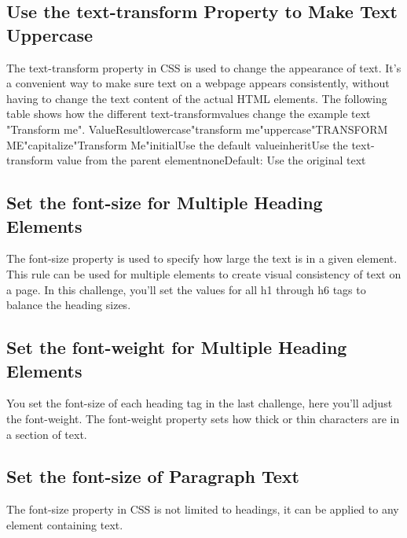 \documentclass{article}%
\begin{document}
\subsection{Use the text{-}transform Property to Make Text Uppercase}%
\label{subsec:Usethetext{-}transformPropertytoMakeTextUppercase}%
The text{-}transform property in CSS is used to change the appearance of text. It's a convenient way to make sure text on a webpage appears consistently, without having to change the text content of the actual HTML elements.\newline%
The following table shows how the different text{-}transformvalues change the example text "Transform me".\newline%
ValueResultlowercase"transform me"uppercase"TRANSFORM ME"capitalize"Transform Me"initialUse the default valueinheritUse the text{-}transform value from the parent elementnoneDefault: Use the original text\newline%

%
\subsection{Set the font{-}size for Multiple Heading Elements}%
\label{subsec:Setthefont{-}sizeforMultipleHeadingElements}%
The font{-}size property is used to specify how large the text is in a given element. This rule can be used for multiple elements to create visual consistency of text on a page. In this challenge, you'll set the values for all h1 through h6 tags to balance the heading sizes.\newline%

%
\subsection{Set the font{-}weight for Multiple Heading Elements}%
\label{subsec:Setthefont{-}weightforMultipleHeadingElements}%
You set the font{-}size of each heading tag in the last challenge, here you'll adjust the font{-}weight.\newline%
The font{-}weight property sets how thick or thin characters are in a section of text.\newline%

%
\subsection{Set the font{-}size of Paragraph Text}%
\label{subsec:Setthefont{-}sizeofParagraphText}%
The font{-}size property in CSS is not limited to headings, it can be applied to any element containing text.\newline%
\end{document}
